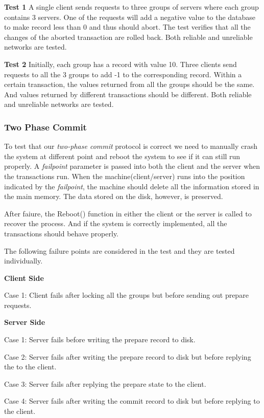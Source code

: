 \documentclass{vldb}
\begin{document}
\textbf{Test 1} A single client sends requests to three groups of servers where each
group contains 3 servers. One of the requests will add a negative value to the
database to make record less than 0 and thus should abort. The test verifies that all
the changes of the aborted transaction are rolled back. Both reliable and unreliable
networks are tested.

\textbf{Test 2} Initially, each group has a record with value 10.  Three clients send
requests to all the 3 groups to add -1 to the corresponding record. Within a certain
transaction, the values returned from all the groups should be the same. And values
returned by different transactions should be different. Both reliable and unreliable
networks are tested.

\subsubsection{Two Phase Commit}

To test that our \textit{two-phase commit} protocol is correct we need to manually
crash the system at different point and reboot the system to see if it can still run
properly. A \textit{failpoint} parameter is passed into both the client and the
server when the transactions run.  When the machine(client/server) runs into the
position indicated by the \textit{failpoint}, the machine should delete all the
information stored in the main memory. The data stored on the disk, however, is
preserved.

After faiure, the Reboot() function in either the client or the server 
is called to recover the process. And if the system is correctly 
implemented, all the transactions should behave properly.

The following failure points are considered in the test and they are 
tested individually.

\textbf{Client Side}

Case 1: Client fails after locking all the groups but before sending 
out prepare requests.

\textbf{Server Side}

Case 1: Server fails before writing the prepare record to disk.

Case 2: Server fails after writing the prepare record to disk but 
before replying the to the client.

Case 3: Server fails after replying the prepare state to the client.

Case 4: Server fails after writing the commit record to disk but 
before replying to the client.
\end{document}
